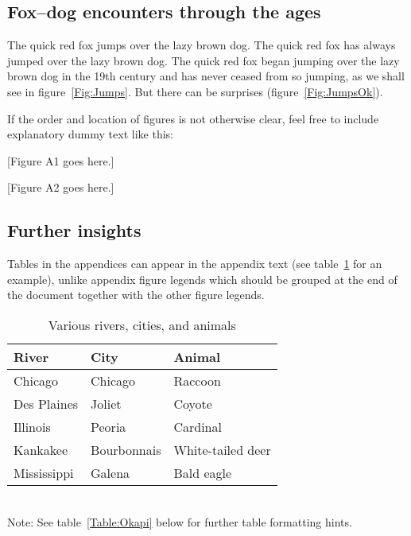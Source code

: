 \documentclass[11pt]{article}
\begin{document}

\renewcommand{\theequation}{A\arabic{equation}}
\renewcommand{\thetable}{A\arabic{table}}
\setcounter{equation}{0}  %
\setcounter{figure}{0}
\setcounter{table}{0}

\subsection*{Fox--dog encounters through the ages}

The quick red fox jumps over the lazy brown dog. The quick red fox has always jumped over the lazy brown dog. The quick red fox began jumping over the lazy brown dog in the 19th century and has never ceased from so jumping, as we shall see in figure~\ref{Fig:Jumps}. But there can be surprises (figure~\ref{Fig:JumpsOk}).

If the order and location of figures is not otherwise clear, feel free to include explanatory dummy text like this:

[Figure A1 goes here.]

[Figure A2 goes here.]

\subsection*{Further insights}

Tables in the appendices can appear in the appendix text (see table~\ref{Table:Rivers} for an example), unlike appendix figure legends which should be grouped at the end of the document together with the other figure legends.

\begin{table}[h]
\caption{Various rivers, cities, and animals}
\label{Table:Rivers}
\centering
\begin{tabular}{lll}\hline
River        & City        & Animal            \\ \hline
Chicago      & Chicago     & Raccoon           \\
Des Plaines  & Joliet      & Coyote            \\
Illinois     & Peoria      & Cardinal          \\
Kankakee     & Bourbonnais & White-tailed deer \\
Mississippi  & Galena      & Bald eagle        \\ \hline
\end{tabular}
\bigskip{}
\\
{\footnotesize Note: See table~\ref{Table:Okapi} below for further table formatting hints.}
\end{table}
\end{document}
